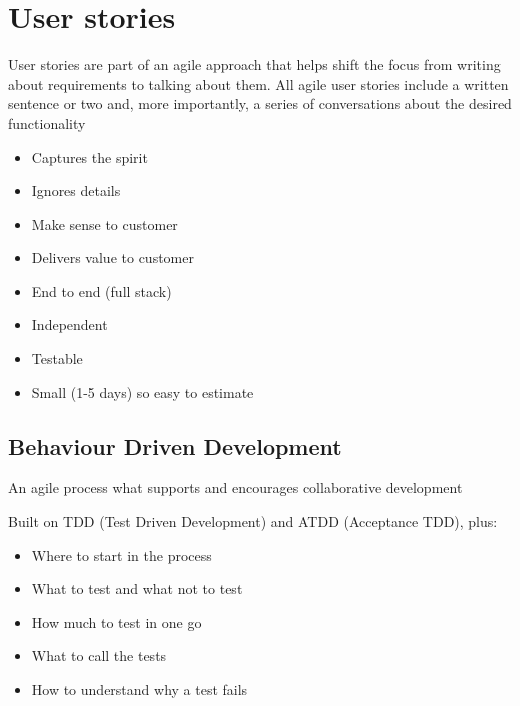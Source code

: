\documentclass{article}[18pt]
\begin{document}
\section{User stories}
\begin{definition}
	User stories are part of an agile approach that helps shift the focus from writing about requirements to talking about them. All agile user stories include a written sentence or two and, more importantly, a series of conversations about the desired functionality
\end{definition}
\begin{itemize}
	\item Captures the spirit
	\item Ignores details
	\item Make sense to customer
	\item Delivers value to customer
	\item End to end (full stack)
	\item Independent
	\item Testable
	\item Small (1-5 days) so easy to estimate
\end{itemize}
\subsection{Behaviour Driven Development}
\begin{definition}
	An agile process what supports and encourages collaborative development
\end{definition}
Built on TDD (Test Driven Development) and ATDD (Acceptance TDD), plus:
\begin{itemize}
	\item Where to start in the process
	\item What to test and what not to test
	\item How much to test in one go
	\item What to call the tests
	\item How to understand why a test fails
\end{itemize}
\end{document}
